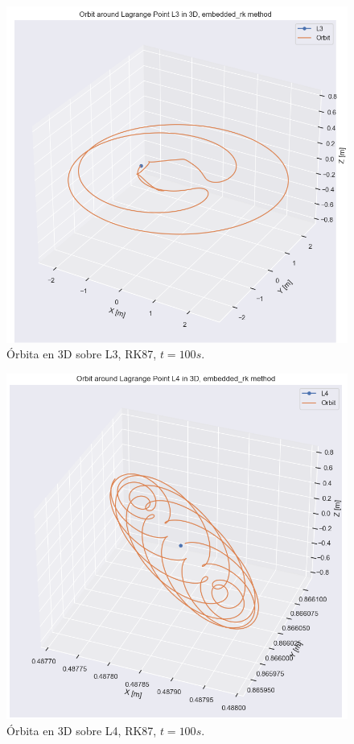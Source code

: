 \documentclass[12pt,a4paper]{article}
\begin{document}
\begin{figure}[H]
	\centering
	\includegraphics[width=\x\textwidth]{FIGURES/mil6/L3_orbit_erk_t100.png}
	\caption{Órbita en 3D sobre L3, RK87, $t = 100 s$.}
	\label{L3_orbit_erk_t100}
\end{figure}
\begin{figure}[H]
	\centering
	\includegraphics[width=\x\textwidth]{FIGURES/mil6/L4_orbit_erk_t100.png}
	\caption{Órbita en 3D sobre L4, RK87, $t = 100 s$.}
	\label{L4_orbit_erk_t100}
\end{figure}
\end{document}
